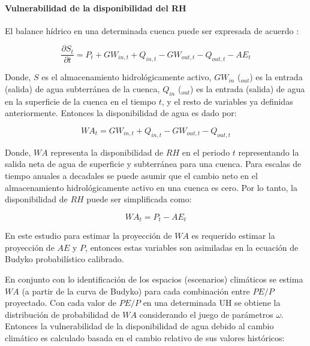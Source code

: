 \documentclass[12pt]{article}
\begin{document}
\clearpage %
\paragraph{Vulnerabilidad de la disponibilidad del RH}\mbox{}

El balance hídrico en una determinada cuenca puede ser expresada de acuerdo \citep{Singh2015}:

\begin{equation}
\frac{\partial S_{t}}{\partial t} = P_{t} + GW_{in,t} + Q_{in,t} - GW_{out,t} - Q_{out,t} - AE_{t} 
\end{equation}

Donde, $S$ es el almacenamiento hidrológicamente activo, $GW_{in}$ ($_{out}$) es la entrada (salida) de agua subterránea de la cuenca, $Q_{in}$ ($_{out}$) es la entrada (salida) de agua en la superficie de la cuenca en el tiempo $t$, y el resto de variables ya definidas anteriormente. Entonces la disponibilidad de agua es dado por:

\begin{equation}
WA_{t} =  GW_{in,t} + Q_{in,t} - GW_{out,t} - Q_{out,t}
\end{equation}

Donde, $WA$ representa la disponibilidad de $RH$ en el periodo $t$ representando la salida neta de agua de superficie y subterránea para una cuenca. Para escalas de tiempo anuales a decadales se puede asumir que el cambio neto en el almacenamiento hidrológicamente activo en una cuenca es cero. Por lo tanto, la disponibilidad de $RH$ puede ser simplificada como: 

\begin{equation}
WA_{t} = P_{t} - AE_{t}
\end{equation}

En este estudio para estimar la proyección de $WA$ es requerido estimar la proyección de $AE$ y $P$, entonces estas variables son asimiladas en la ecuación de Budyko probabilístico calibrado.

En conjunto con lo identificación de los espacios (escenarios) climáticos se estima $WA$ (a partir de la curva de Budyko) para cada combinación entre $PE/P$ proyectado. Con cada valor de $PE/P$ en una determinada UH se obtiene la distribución de probabilidad de $WA$ considerando el juego de parámetros $\omega$. Entonces la vulnerabilidad de la disponibilidad de agua debido al cambio climático es calculado basada en el cambio relativo de sus valores históricos:
\end{document}
